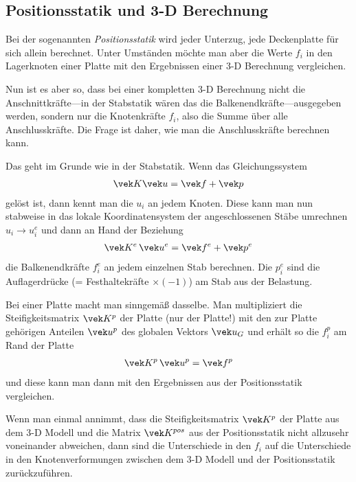 {\textcolor{blau2}{\section{Positionsstatik und 3-D Berechnung}}
Bei der sogenannten {\em Positionsstatik\/} wird jeder Unterzug, jede Deckenplatte f\"{u}r sich allein berechnet. Unter Umst\"{a}nden m\"{o}chte man aber die Werte $f_i$ in den Lagerknoten einer Platte mit den Ergebnissen einer 3-D Berechnung vergleichen.

Nun ist es aber so, dass bei einer kompletten 3-D Berechnung nicht die Anschnittkr\"{a}fte---in der Stabstatik w\"{a}ren das die Balkenendkr\"{a}fte---ausgegeben werden, sondern nur die Knotenkr\"{a}fte $f_i$, also die Summe \"{u}ber alle Anschlusskr\"{a}fte. Die Frage ist daher, wie man die  Anschlusskr\"{a}fte berechnen kann.

Das geht im Grunde wie in der Stabstatik. Wenn das Gleichungssystem
\begin{align} \label{Eq105}
\vek K\vek u = \vek f + \vek p
\end{align}
gel\"{o}st ist, dann kennt man die $u_i$ an jedem Knoten. Diese kann man nun stabweise in das lokale Koordinatensystem der angeschlossenen St\"{a}be umrechnen $u_i \to u_i^e$ und dann an Hand der Beziehung
\begin{align}\label{Eq106}
\vek K^e\,\vek u^e = \vek f^e + \vek p^e
\end{align}
die Balkenendkr\"{a}fte $f_i^e$ an jedem einzelnen Stab berechnen. Die $p_i^e$ sind die Auflagerdr\"{u}cke (= Festhaltekr\"{a}fte $\times (-1)$) am Stab aus der Belastung.

Bei einer Platte macht man sinngem\"{a}{\ss} dasselbe. Man multipliziert die Steifigkeitsmatrix $\vek K^p$ der Platte (nur der Platte!) mit den zur Platte geh\"{o}rigen Anteilen $\vek u^p$ des globalen Vektors $\vek u_G$ und erh\"{a}lt so die $f_i^p$ am Rand der Platte
\begin{align}
\vek K^p\,\vek u^p = \vek f^p
\end{align}
und diese kann man dann mit den Ergebnissen aus der Positionsstatik vergleichen.

Wenn man einmal annimmt, dass die Steifigkeitsmatrix $\vek K^p$ der Platte aus dem 3-D Modell und die Matrix $\vek K^{pos}$ aus der Positionsstatik nicht allzusehr voneinander abweichen, dann sind die Unterschiede in den $f_i$ auf die Unterschiede in den Knotenverformungen zwischen dem 3-D Modell und der Positionsstatik zur\"{u}ckzuf\"{u}hren.\\

}
